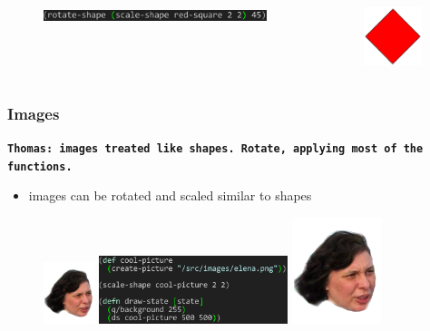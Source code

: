 \documentclass{beamer}
\newcommand{\comment}[1]{{\bf \tt  {#1}}}
\newcommand{\thcomment}[1]{\textcolor{BestBlue}{\comment{Thomas: {#1}}}}
\begin{document}
\begin{frame}[fragile]
\begin{itemize}
		\begin{columns}[t]
		\begin{column}{.45\textwidth}
			\begin{figure}[h]
			\includegraphics[width=6.5cm]{PresentationImages/rotateAndScaleRedCode.png}
			\end{figure}
		\end{column}
		\begin{column}{.3\textwidth}
			\begin{figure}[h]
			\includegraphics[width=1.7cm]{PresentationImages/red-rectangle-scale-rotate.png}
			\end{figure}		
		\end{column}
		\end{columns}
	\end{itemize}
\end{frame}


\begin{frame}
\frametitle{Images}
\thcomment{images treated like shapes. Rotate, applying most of the functions.}
	\begin{itemize}
		\item images can be rotated and scaled similar to shapes
	\end{itemize}
	\begin{figure}
		\vspace{-0.3cm}
		\includegraphics[width=1.5cm]{PresentationImages/elena.png}
		\hspace{0.4cm}
		\includegraphics[width=5.5cm]{PresentationImages/pictureCode.png}
		\hspace{0.4cm}
		\includegraphics[width=2.6cm]{PresentationImages/elena.png}
	\end{figure}

\end{frame}
\end{document}
